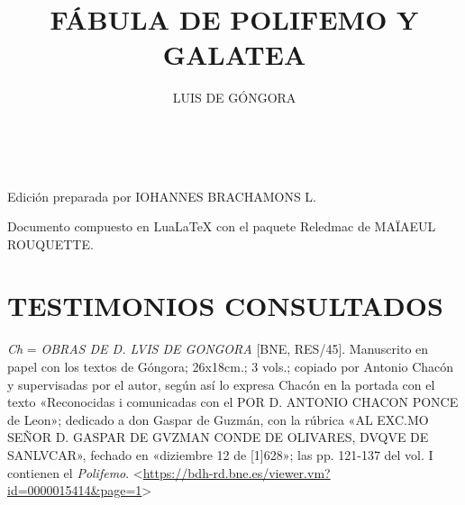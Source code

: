 \documentclass[11pt,a4paper,twoside]{article}
\title{FÁBULA DE POLIFEMO Y GALATEA}
\author{\fontsize{14}{11.96}\selectfont LUIS DE GÓNGORA}
\date{\vspace{60pt}\fontsize{11}{11}\selectfont{TEXTO Y VARIANTES DE LA REDACCIÓN PRIMITIVA}\\\fontsize{40}{11}\selectfont{\vfill\LaTeX}}
\begin{document}
	{
			\maketitle
		}
		\newpage%

\hskip0pt
\vfill
\begin{flushright}
    Edición preparada por {\fontsize{9}{1}\selectfont IOHANNES BRACHAMONS L}.
\end{flushright}

\begin{flushright}
	Documento compuesto en LuaLaTeX con el paquete Reledmac de {\fontsize{9}{11}\selectfont MAÏAEUL ROUQUETTE}.
\end{flushright}
\newpage
%
\tableofcontents
\newpage
%
\setcounter{page}{1}
\section*{\fontsize{11}{14}\selectfont TESTIMONIOS CONSULTADOS}

\textit{Ch} = \textit{\fontsize{9}{11}\selectfont OBRAS DE D. LVIS DE GONGORA} [BNE, RES/45].
%
Manuscrito en papel con los textos de Góngora; 26x18cm.; 3 vols.; copiado por Antonio Chacón y supervisadas por el autor, según así lo expresa Chacón en la portada con el texto «Reconocidas i comunicadas con el {\fontsize{9}{11}\selectfont POR D. ANTONIO CHACON PONCE} de Leon»; dedicado a don Gaspar de Guzmán, con la rúbrica «{\fontsize{9}{11}\selectfont AL EXC.MO SEÑOR D. GASPAR DE GVZMAN CONDE DE OLIVARES, DVQVE DE SANLVCAR}», fechado en «diziembre 12 de [1]628»; las pp. 121-137 del vol. I contienen el \textit{Polifemo}. <\url{https://bdh-rd.bne.es/viewer.vm?id=0000015414&page=1}>\par
\end{document}
